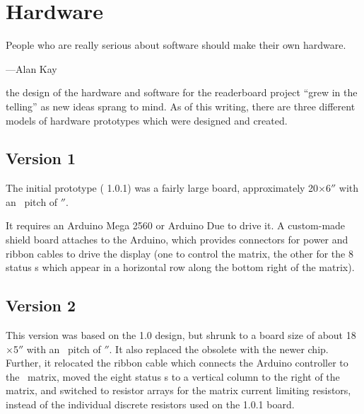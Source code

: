 \newpage
\tableofcontents
\newpage
\listoffigures
\listoftables
\mainmatter

%
\chapter{Hardware}
\epigraph{People who are really serious about software should make their own hardware.}{---Alan Kay}
 the design of the hardware and software for the read\-erboard
project ``grew in the telling'' as new ideas sprang to mind. As of this writing, there are three
different models of hardware prototypes which were designed and created.

\section{Version 1}
The initial prototype ( 1.0.1) was a fairly large board, approximately 20$\times$6$''$
with an \led\ pitch of $''$.

It requires an Arduino Mega 2560 or Arduino Due to drive it. A custom-made shield board attaches to
the Arduino, which provides connectors for power and ribbon cables to drive the display (one to control
the matrix, the other for the 8 status \led s which appear in a horizontal row along the bottom
right of the matrix).


\section{Version 2}
This version was based on the 1.0 design, but shrunk to a board size of about 18$\times$5$''$
with an \led\ pitch of $''$. It also replaced the obsolete  with the newer  chip.
Further, it relocated the ribbon cable which connects the Arduino controller to the \led\ matrix, moved the
eight status \led s to a vertical column to the right of the matrix, and switched to resistor arrays
for the matrix current limiting resistors, instead of the individual discrete resistors used on the 1.0.1 board.

